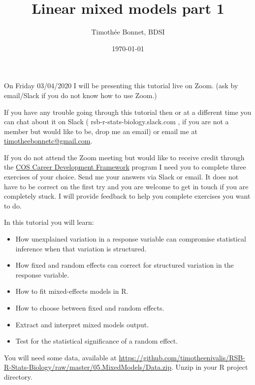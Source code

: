 \documentclass[12pt,a4paper]{scrartcl}\usepackage[]{graphicx}\usepackage[]{color}
\title{Linear mixed models part 1}
\date{\today}
\author{Timoth\'ee Bonnet, BDSI}
\begin{document}
\maketitle

On Friday 03/04/2020 I will be presenting this tutorial live on Zoom. (ask by email/Slack if you do not know how to use Zoom.)

If you have any trouble going through this tutorial then or at a different time you can chat about it on Slack ( rsb-r-stats-biology.slack.com , if you are not a member but would like to be, drop me an email) or email me at \href{mailto:timotheebonnetc@gmail.com}{timotheebonnetc@gmail.com}.

If you do not attend the Zoom meeting but would like to receive credit through the \href{https://wattlecourses.anu.edu.au/enrol/index.php?id=23938}{COS Career Development Framework} program I need you to complete three exercises of your choice. Send me your answers via Slack or email. It does not have to be correct on the first try and you are welcome to get in touch if you are completely stuck. I will provide feedback to help you complete exercises you want to do.

In this tutorial you will learn:

\begin{itemize}
    \item How unexplained variation in a response variable can compromise statistical inference when that variation is structured.
    \item How fixed and random effects can correct for structured variation in the response variable.
    \item How to fit mixed-effects models in R.
    \item How to choose between fixed and random effects.
    \item Extract and interpret mixed models output.
    \item Test for the statistical significance of a random effect.
\end{itemize}

You will need some data, available at \href{https://github.com/timotheenivalis/RSB-R-Stats-Biology/raw/master/05.MixedModels/Data.zip}{https://github.com/timotheenivalis/RSB-R-Stats-Biology/raw/master/05.MixedModels/Data.zip}. Unzip in your R project directory.

\tableofcontents
\ListOfExerciseInToc
{}

\clearpage
\end{document}
